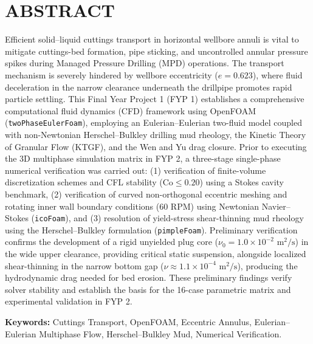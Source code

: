 \newpage
{}
\chapter*{ABSTRACT}

\noindent Efficient solid--liquid cuttings transport in horizontal wellbore annuli is vital to mitigate cuttings-bed formation, pipe sticking, and uncontrolled annular pressure spikes during Managed Pressure Drilling (MPD) operations. The transport mechanism is severely hindered by wellbore eccentricity ($e = 0.623$), where fluid deceleration in the narrow clearance underneath the drillpipe promotes rapid particle settling. This Final Year Project 1 (FYP 1) establishes a comprehensive computational fluid dynamics (CFD) framework using OpenFOAM (\texttt{twoPhaseEulerFoam}), employing an Eulerian--Eulerian two-fluid model coupled with non-Newtonian Herschel--Bulkley drilling mud rheology, the Kinetic Theory of Granular Flow (KTGF), and the Wen and Yu drag closure. Prior to executing the 3D multiphase simulation matrix in FYP 2, a three-stage single-phase numerical verification was carried out: (1) verification of finite-volume discretization schemes and CFL stability ($\text{Co} \le 0.20$) using a Stokes cavity benchmark, (2) verification of curved non-orthogonal eccentric meshing and rotating inner wall boundary conditions (60 RPM) using Newtonian Navier--Stokes (\texttt{icoFoam}), and (3) resolution of yield-stress shear-thinning mud rheology using the Herschel--Bulkley formulation (\texttt{pimpleFoam}). Preliminary verification confirms the development of a rigid unyielded plug core ($\nu_0 = 1.0 \times 10^{-2}\text{ m}^2/\text{s}$) in the wide upper clearance, providing critical static suspension, alongside localized shear-thinning in the narrow bottom gap ($\nu \approx 1.1 \times 10^{-4}\text{ m}^2/\text{s}$), producing the hydrodynamic drag needed for bed erosion. These preliminary findings verify solver stability and establish the basis for the 16-case parametric matrix and experimental validation in FYP 2.

\vspace{0.6cm}
\noindent \textbf{Keywords:} Cuttings Transport, OpenFOAM, Eccentric Annulus, Eulerian--Eulerian Multiphase Flow, Herschel--Bulkley Mud, Numerical Verification.
